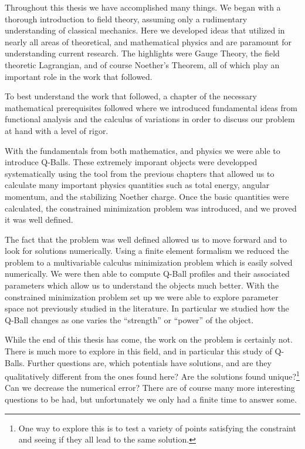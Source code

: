 Throughout this thesis we have accomplished many things. We began with a
thorough introduction to field theory, assuming only a rudimentary understanding
of classical mechanics. Here we developed ideas that utilized in nearly all
areas of theoretical, and mathematical physics and are paramount for
understanding current research. The highlights were Gauge Theory, the field
theoretic Lagrangian, and of course Noether's Theorem, all of which play an
important role in the work that followed.

To best understand the work that followed, a chapter of the necessary
mathematical prerequisites followed where we introduced fundamental ideas from
functional analysis and the calculus of variations in order to discuss our
problem at hand with a level of rigor.

With the fundamentals from both mathematics, and physics we were able to
introduce Q-Balls. These extremely imporant objects were developped
systematically using the tool from the previous chapters that allowed us to
calculate many important physics quantities such as total energy, angular
momentum, and the stabilizing Noether charge. Once the basic quantities were
calculated, the constrained minimization problem was introduced, and we proved
it was well defined.

The fact that the problem was well defined allowed us to move forward and to
look for solutions numerically. Using a finite element formalism we reduced the
problem to a multivariable calculus minimization problem which is easily solved
numerically. We were then able to compute Q-Ball profiles and their associated
parameters which allow us to understand the objects much better. With the
constrained minimization problem set up we were able to explore parameter space
not previously studied in the literature. In particular we studied how the
Q-Ball changes as one varies the ``strength'' or ``power'' of the object.

While the end of this thesis has come, the work on the problem is certainly not.
There is much more to explore in this field, and in particular this study of
Q-Balls. Further questions are, which potentials have solutions, and are they
qualitatively different from the ones found here? Are the solutions found
unique?\footnote{One way to explore this is to test a variety of points
satisfying the constraint and seeing if they all lead to the same solution.} Can
we decrease the numerical error? There are of course many more interesting
questions to be had, but unfortunately we only had a finite time to answer some.